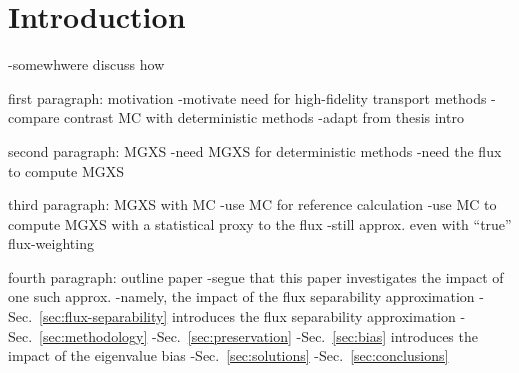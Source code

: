 \section{Introduction}
\label{sec:intro}

-somewhwere discuss how 

first paragraph: motivation
-motivate need for high-fidelity transport methods
-compare contrast MC with deterministic methods
-adapt from thesis intro

second paragraph: MGXS
-need MGXS for deterministic methods
-need the flux to compute MGXS

third paragraph: MGXS with MC
-use MC for reference calculation
-use MC to compute MGXS with a statistical proxy to the flux
-still approx. even with ``true'' flux-weighting

fourth paragraph: outline paper
-segue that this paper investigates the impact of one such approx.
  -namely, the impact of the flux separability approximation
-Sec.~\ref{sec:flux-separability} introduces the flux separability approximation
-Sec.~\ref{sec:methodology}
-Sec.~\ref{sec:preservation}
-Sec.~\ref{sec:bias} introduces the impact of the eigenvalue bias
-Sec.~\ref{sec:solutions}
-Sec.~\ref{sec:conclusions}